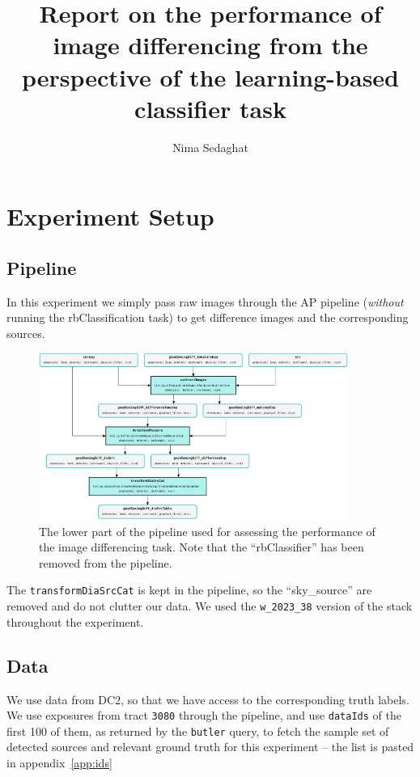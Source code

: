\documentclass[DM,authoryear,toc]{lsstdoc}
\title{Report on the performance of image differencing from the perspective of the learning-based classifier task}
\author{%
Nima Sedaghat
}
\date{\vcsDate}
\begin{document}
\maketitle


\section{Experiment Setup}
\subsection{Pipeline}
In this experiment we simply pass raw images through the AP pipeline (\emph{without} running the rbClassification task) to get difference images and the corresponding sources.

\begin{figure}[h]
  \centering
  \includegraphics[width=0.9\textwidth]{pipeline.png}
  \caption{The lower part of the pipeline used for assessing the performance of the image differencing task. Note that the ``rbClassifier'' has been removed from the pipeline.}
  \label{fig:exposure_hist}
\end{figure}

The \texttt{transformDiaSrcCat} is kept in the pipeline, so the ``sky\_source'' are removed and do not clutter our data.
We used the \texttt{w\_2023\_38} version of the stack throughout the experiment.

\subsection{Data}
We use data from DC2, so that we have access to the corresponding truth labels. We use exposures from tract \texttt{3080} through the pipeline, and use \texttt{dataIds} of the first 100 of them, as returned by the \texttt{butler} query, to fetch the sample set of detected sources and relevant ground truth for this experiment -- the list is pasted in appendix~\ref{app:ids}
\end{document}
